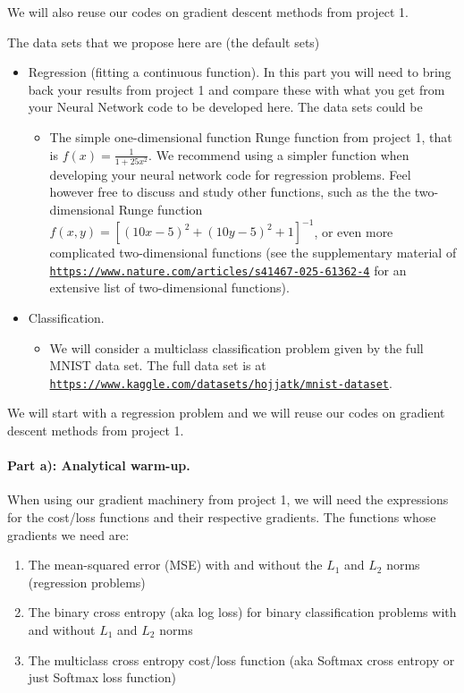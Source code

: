 \documentclass[%
oneside,                 %
final,                   %
10pt]{article}
\begin{document}
We will also reuse our codes on gradient descent methods from project 1.

The data sets that we propose here are (the default sets)

\begin{itemize}
\item Regression (fitting a continuous function). In this part you will need to bring back your results from project 1 and compare these with what you get from your Neural Network code to be developed here. The data sets could be
\begin{itemize}

  \item The simple one-dimensional function Runge function from project 1, that is $f(x) = \frac{1}{1+25x^2}$. We recommend using a simpler function when developing your neural network code for regression problems. Feel however free to discuss and study other functions, such as the the two-dimensional Runge function $f(x,y)=\left[(10x - 5)^2 + (10y - 5)^2 + 1 \right]^{-1}$, or even more complicated two-dimensional functions (see the supplementary material of \href{{https://www.nature.com/articles/s41467-025-61362-4}}{\nolinkurl{https://www.nature.com/articles/s41467-025-61362-4}} for an extensive list of two-dimensional functions). 

\end{itemize}

\noindent
\item Classification.
\begin{itemize}

 \item We will consider a multiclass classification problem given by the full MNIST data set. The full data set is at \href{{https://www.kaggle.com/datasets/hojjatk/mnist-dataset}}{\nolinkurl{https://www.kaggle.com/datasets/hojjatk/mnist-dataset}}.
\end{itemize}

\noindent
\end{itemize}

\noindent
We will start with a regression problem and we will reuse our codes on gradient descent methods from project 1.

\paragraph{Part a): Analytical warm-up.}
When using our gradient machinery from project 1, we will need the expressions for the cost/loss functions and their respective
gradients. The functions whose gradients we need are:
\begin{enumerate}
\item The mean-squared error (MSE) with and without the $L_1$ and $L_2$ norms (regression problems)

\item The binary cross entropy (aka log loss)  for binary classification problems with and without $L_1$ and $L_2$ norms

\item The multiclass cross entropy cost/loss function (aka Softmax cross entropy or just Softmax loss function)
\end{enumerate}
\end{document}
